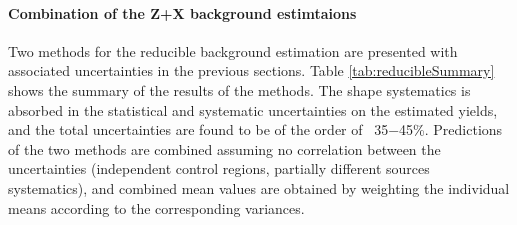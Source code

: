 \paragraph{Combination of the Z+X background estimtaions}
\par Two methods for the reducible background estimation are presented with associated uncertainties in the previous sections. Table \ref{tab:reducibleSummary} shows the summary of the results of the methods.
The shape systematics is absorbed in the statistical and systematic uncertainties on the estimated yields, and the total uncertainties are found to be of the order of ~35$-$45\%.
Predictions of the two methods are combined assuming no correlation between the uncertainties (independent control regions, partially different sources systematics), and combined mean values are obtained by weighting the individual means according to the corresponding variances.


